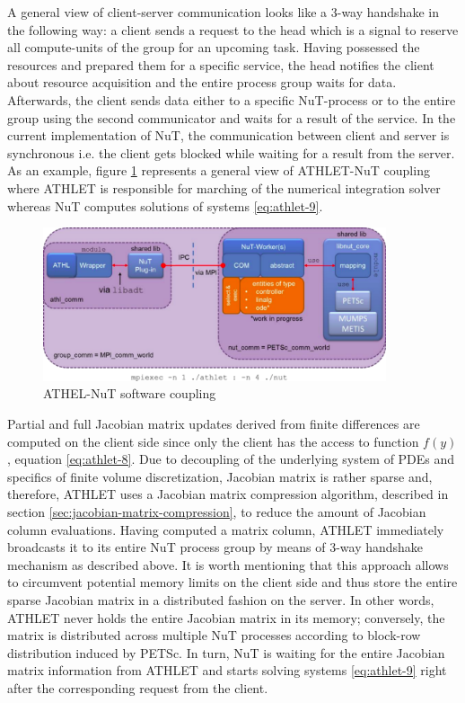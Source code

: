 A general view of client-server communication looks like a 3-way handshake in the following way: a client sends a request to the head which is a signal to reserve all compute-units of the group for an upcoming task. Having possessed the resources and prepared them for a specific service, the head notifies the client about resource acquisition and the entire process group waits for data. Afterwards, the client sends data either to a specific NuT-process or to the entire group using the second communicator and waits for a result of the service. In the current implementation of NuT, the communication between client and server is synchronous i.e. the client gets blocked while waiting for a result from the server. \\


As an example, figure \ref{fig:introduction-athlet-nut-coupling} represents a general view of ATHLET-NuT coupling where ATHLET is responsible for marching of the numerical integration solver whereas NuT computes solutions of systems \ref{eq:athlet-9}.


\figpointer{\ref{fig:introduction-athlet-nut-coupling}}
\begin{figure}[htpb]
  \centering
  \includegraphics[width=0.9\textwidth]{figures/introduction-athlet-nut-coupling.png}
\caption{ATHEL-NuT software coupling}
\label{fig:introduction-athlet-nut-coupling}
\end{figure}


Partial and full Jacobian matrix updates derived from finite differences are computed on the client side since only the client has the access to function $f(y)$, equation \ref{eq:athlet-8}. Due to decoupling of the underlying system of PDEs and specifics of finite volume discretization, Jacobian matrix is rather sparse and, therefore, ATHLET uses a Jacobian matrix compression algorithm, described in section \ref{sec:jacobian-matrix-compression}, to reduce the amount of Jacobian column evaluations. Having computed a matrix column, ATHLET immediately broadcasts it to its entire NuT process group by means of 3-way handshake mechanism as described above. It is worth mentioning that this approach allows to circumvent potential memory limits on the client side and thus store the entire sparse Jacobian matrix in a distributed fashion on the server. In other words, ATHLET never holds the entire Jacobian matrix in its memory; conversely, the matrix is distributed across multiple NuT processes according to block-row distribution induced by PETSc. In turn, NuT is waiting for the entire Jacobian matrix information from ATHLET and starts solving systems \ref{eq:athlet-9} right after the corresponding request from the client.\\



